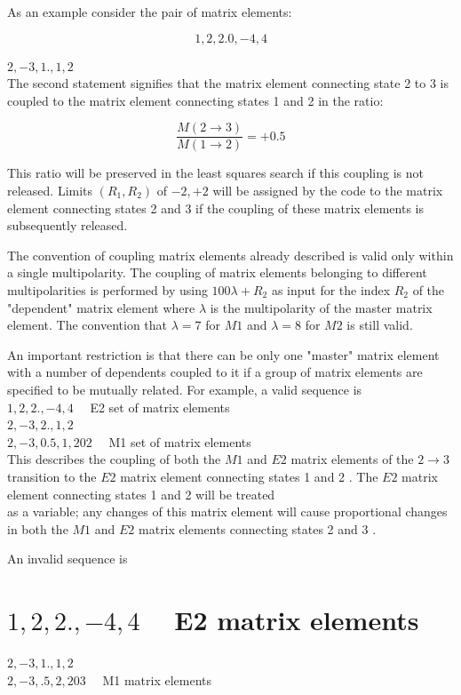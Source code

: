 \documentclass[10pt]{article}
\begin{document}
As an example consider the pair of matrix elements:

$$
1,2,2.0,-4,4
$$

$2,-3,1 ., 1,2$\\
The second statement signifies that the matrix element connecting state 2 to 3 is coupled to the matrix element connecting states 1 and 2 in the ratio:

$$
\frac{M(2 \rightarrow 3)}{M(1 \rightarrow 2)}=+0.5
$$

This ratio will be preserved in the least squares search if this coupling is not released. Limits $\left(R_{1}, R_{2}\right)$ of $-2,+2$ will be assigned by the code to the matrix element connecting states 2 and 3 if the coupling of these matrix elements is subsequently released.

The convention of coupling matrix elements already described is valid only within a single multipolarity. The coupling of matrix elements belonging to different multipolarities is performed by using $100 \lambda+R_{2}$ as input for the index $R_{2}$ of the "dependent" matrix element where $\lambda$ is the multipolarity of the master matrix element. The convention that $\lambda=7$ for $M 1$ and $\lambda=8$ for $M 2$ is still valid.

An important restriction is that there can be only one "master" matrix element with a number of dependents coupled to it if a group of matrix elements are specified to be mutually related. For example, a valid sequence is\\
$1,2,2 .,-4,4 \quad$ E2 set of matrix elements\\
$2,-3,2 ., 1,2$\\
$2,-3,0.5,1,202 \quad$ M1 set of matrix elements\\
This describes the coupling of both the $M 1$ and $E 2$ matrix elements of the $2 \rightarrow 3$ transition to the $E 2$ matrix element connecting states 1 and 2 . The $E 2$ matrix element connecting states 1 and 2 will be treated\\
as a variable; any changes of this matrix element will cause proportional changes in both the $M 1$ and $E 2$ matrix elements connecting states 2 and 3 .

An invalid sequence is

\section*{$1,2,2 .,-4,4 \quad$ E2 matrix elements}
$2,-3,1 ., 1,2$\\
$2,-3, .5,2,203 \quad$ M1 matrix elements
\end{document}
